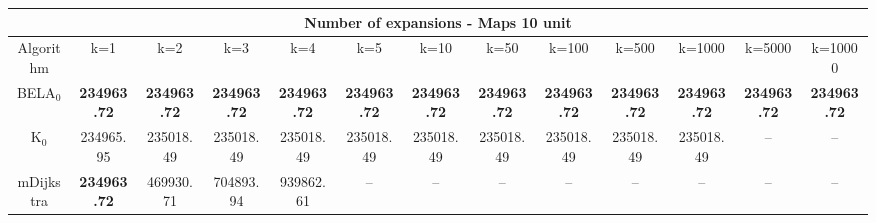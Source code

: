 \begin{tabular}{c|cccccccccccc}\toprule
\multicolumn{13}{c}{Number of expansions - Maps 10 unit}\\ \midrule
Algorithm & k=1 & k=2 & k=3 & k=4 & k=5 & k=10 & k=50 & k=100 & k=500 & k=1000 & k=5000 & k=10000 \\ \midrule
BELA$_0$ & \textbf{234963.72} & \textbf{234963.72} & \textbf{234963.72} & \textbf{234963.72} & \textbf{234963.72} & \textbf{234963.72} & \textbf{234963.72} & \textbf{234963.72} & \textbf{234963.72} & \textbf{234963.72} & \textbf{234963.72} & \textbf{234963.72} \\
K$_0$ & 234965.95 & 235018.49 & 235018.49 & 235018.49 & 235018.49 & 235018.49 & 235018.49 & 235018.49 & 235018.49 & 235018.49 & -- & -- \\
mDijkstra & \textbf{234963.72} & 469930.71 & 704893.94 & 939862.61 & -- & -- & -- & -- & -- & -- & -- & -- \\ \bottomrule 
\end{tabular}
